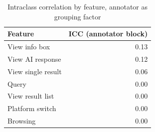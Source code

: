 \begin{table}[t]
\centering
\caption{Intraclass correlation by feature, annotator as grouping factor}
\label{tab:rq5-icc-by-feature}
\begin{tabular}{lr}
\toprule
Feature & ICC (annotator block) \\
\midrule
View info box & 0.13 \\
View AI response & 0.12 \\
View single result & 0.06 \\
Query & 0.00 \\
View result list & 0.00 \\
Platform switch & 0.00 \\
Browsing & 0.00 \\
\bottomrule
\end{tabular}
\end{table}
